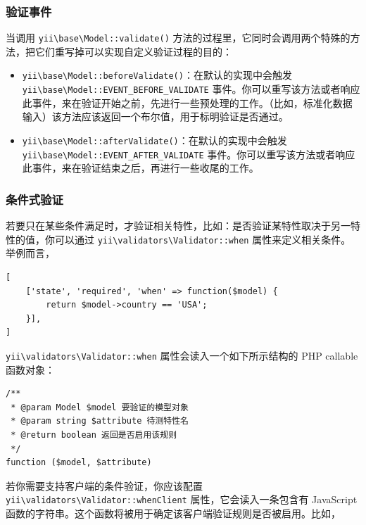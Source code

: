 \subsubsection{验证事件 \label{input-validation.md::validation-events}}
当调用 \texttt{yii{\allowbreak{}\textbackslash}base{\allowbreak{}\textbackslash}Model\allowbreak{}::\allowbreak{}validate()} 方法的过程里，它同时会调用两个特殊的方法，把它们重写掉可以实现自定义验证过程的目的：

\begin{itemize}
\item \texttt{yii{\allowbreak{}\textbackslash}base{\allowbreak{}\textbackslash}Model\allowbreak{}::\allowbreak{}beforeValidate()}：在默认的实现中会触发 \texttt{yii{\allowbreak{}\textbackslash}base{\allowbreak{}\textbackslash}Model\allowbreak{}::\allowbreak{}EVENT\_BEFORE\_VALIDATE} 事件。你可以重写该方法或者响应此事件，来在验证开始之前，先进行一些预处理的工作。（比如，标准化数据输入）该方法应该返回一个布尔值，用于标明验证是否通过。
\item \texttt{yii{\allowbreak{}\textbackslash}base{\allowbreak{}\textbackslash}Model\allowbreak{}::\allowbreak{}afterValidate()}：在默认的实现中会触发 \texttt{yii{\allowbreak{}\textbackslash}base{\allowbreak{}\textbackslash}Model\allowbreak{}::\allowbreak{}EVENT\_AFTER\_VALIDATE} 事件。你可以重写该方法或者响应此事件，来在验证结束之后，再进行一些收尾的工作。
\end{itemize}
\subsubsection{条件式验证 \label{input-validation.md::conditional-validation}}
若要只在某些条件满足时，才验证相关特性，比如：是否验证某特性取决于另一特性的值，你可以通过
\texttt{yii{\allowbreak{}\textbackslash}validators{\allowbreak{}\textbackslash}Validator\allowbreak{}::\allowbreak{}when} 属性来定义相关条件。举例而言，

\lstset{language=php}\begin{lstlisting}
[
    ['state', 'required', 'when' => function($model) {
        return $model->country == 'USA';
    }],
]
\end{lstlisting}
\texttt{yii{\allowbreak{}\textbackslash}validators{\allowbreak{}\textbackslash}Validator\allowbreak{}::\allowbreak{}when} 属性会读入一个如下所示结构的 PHP callable 函数对象：

\lstset{language=php}\begin{lstlisting}
/**
 * @param Model $model 要验证的模型对象
 * @param string $attribute 待测特性名
 * @return boolean 返回是否启用该规则
 */
function ($model, $attribute)
\end{lstlisting}
若你需要支持客户端的条件验证，你应该配置
\texttt{yii{\allowbreak{}\textbackslash}validators{\allowbreak{}\textbackslash}Validator\allowbreak{}::\allowbreak{}whenClient} 属性，它会读入一条包含有 JavaScript 函数的字符串。这个函数将被用于确定该客户端验证规则是否被启用。比如，

